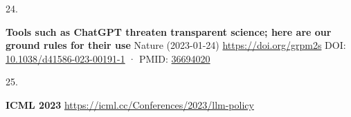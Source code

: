 \documentclass[
]{article}
\newlength{\cslhangindent}
\newlength{\csllabelwidth}
\newlength{\cslentryspacingunit} %
\newenvironment{CSLReferences}[2] %
 {%
  \setlength{\parindent}{0pt}
  \ifodd #1
  \let\oldpar\par
  \def\par{\hangindent=\cslhangindent\oldpar}
  \fi
  \setlength{\parskip}{#2\cslentryspacingunit}
 }%
 {}
\newcommand{\CSLBlock}[1]{#1\hfill\break}
\newcommand{\CSLLeftMargin}[1]{\parbox[t]{\csllabelwidth}{#1}}
\newcommand{\CSLRightInline}[1]{\parbox[t]{\linewidth - \csllabelwidth}{#1}\break}
\begin{document}
\begin{CSLReferences}{0}{0}
\leavevmode{}%
\CSLLeftMargin{24. }%
\CSLRightInline{\textbf{Tools such as ChatGPT threaten transparent science; here are our ground rules for their use}
\CSLBlock{Nature} (2023-01-24) \url{https://doi.org/grpm2s}
\CSLBlock{DOI: \href{https://doi.org/10.1038/d41586-023-00191-1}{10.1038/d41586-023-00191-1} · PMID: \href{https://www.ncbi.nlm.nih.gov/pubmed/36694020}{36694020}}}

\leavevmode{}%
\CSLLeftMargin{25. }%
\CSLRightInline{\textbf{ICML 2023} \url{https://icml.cc/Conferences/2023/llm-policy}}

\end{CSLReferences}
\end{document}
